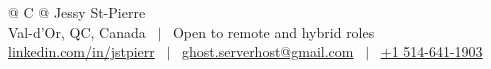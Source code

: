 
\begin{tabularx}{\linewidth}{@{} C @{}}
\huge{Jessy St-Pierre} \\[2pt]
Val-d'Or, QC, Canada \ $|$ \ Open to remote and hybrid roles \\
\href{https://www.linkedin.com/in/jstpierr/}{linkedin.com/in/jstpierr} \ $|$ \
\href{mailto:ghost.serverhost@gmail.com}{ghost.serverhost@gmail.com} \ $|$ \
\href{tel:+15146411903}{+1 514-641-1903} \\
\end{tabularx}

\vspace{0.5em}

